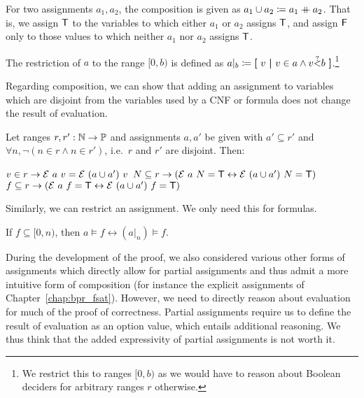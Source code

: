 \begin{definition}
  For two assignments $a_1, a_2$, the composition  is given as $a_1 \cup a_2 \coloneqq a_1 \mathbin{+\mkern-10mu+} a_2$. 
  That is, we assign $\mathsf{T}$ to the variables to which either $a_1$ or $a_2$ assigns $\mathsf{T}$, and assign $\mathsf{F}$ only to those values to which neither $a_1$ nor $a_2$ assigns $\mathsf{T}$.

  The restriction of $a$ to the range $[0, b)$ is defined as $a|_b \defeq \withl v \withm v \in a \land v \oset{?}{<}{+0.7} b \withr$.\footnote{We restrict this to ranges $[0, b)$ as we would have to reason about Boolean deciders for arbitrary ranges $r$ otherwise.} 
\end{definition}

Regarding composition, we can show that adding an assignment to variables which are disjoint from the variables used by a CNF or formula does not change the result of evaluation. 
\begin{proposition}\label{prop:eval_ext_assgn}
  Let ranges $r, r' : \mathbb{N} \rightarrow \mathbb{P}$ and assignments $a, a'$ be given with $a' \subseteq r'$ and $\forall n, \lnot (n \in r \land n \in r')$, i.e.\ $r$ and $r'$ are disjoint. Then:
  \begin{enumerate}
     $v \in r \rightarrow \mathcal{E}~a~v = \mathcal{E}~(a \cup a')~v$
     $N \subseteq r \rightarrow (\mathcal{E}~a~N = \mathsf{T} \leftrightarrow \mathcal{E}~(a \cup a')~N = \mathsf{T})$
     $f \subseteq r \rightarrow (\mathcal{E}~a~f = \mathsf{T} \leftrightarrow \mathcal{E}~(a \cup a')~f = \mathsf{T})$
  \end{enumerate}
\end{proposition}

Similarly, we can restrict an assignment. We only need this for formulas. 
\begin{proposition}\label{prop:eval_restrict}
  If $f \subseteq [0, n)$, then $a \models f \leftrightarrow (a|_n) \models f$.
\end{proposition}

\begin{remark}
  During the development of the proof, we also considered various other forms of assignments which directly allow for partial assignments and thus admit a more intuitive form of composition (for instance the explicit assignments of Chapter~\ref{chap:bpr_fsat}). 
  However, we need to directly reason about evaluation for much of the proof of correctness. Partial assignments require us to define the result of evaluation as an option value, which entails additional reasoning. 
  We thus think that the added expressivity of partial assignments is not worth it.
\end{remark}

